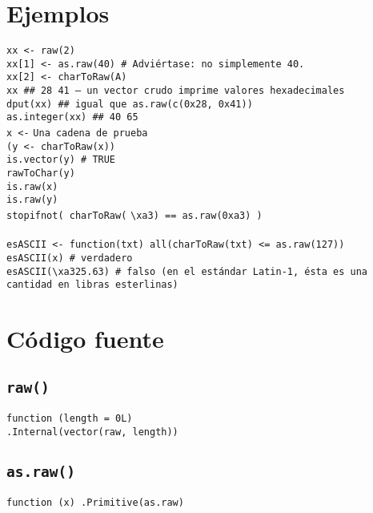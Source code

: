 \documentclass{article}[letter, 12pt]
\newlength\tindent
\renewcommand{\indent}{\hspace*{\tindent}}
\def\code#1{\texttt{#1}}
\begin{document}
\section{\color{gray}Ejemplos}
\indent\code{xx <- raw(2)} \\
\indent\code{xx[1] <- as.raw(40)     \# Adviértase: no simplemente 40.} \\
\indent\code{xx[2] <- charToRaw(}\textquotedbl\code{A}\textquotedbl\code{)} \\
\indent\code{xx       \#\# 28 41   -- un vector crudo imprime valores hexadecimales} \\
\indent\code{dput(xx) \#\# igual que as.raw(c(0x28, 0x41))} \\
\indent\code{as.integer(xx) \#\# 40 65} \\
\indent\code{x <-} \textquotedbl\code{Una cadena de prueba}\textquotedbl\ \\
\indent\code{(y <- charToRaw(x))} \\
\indent\code{is.vector(y) \# TRUE} \\
\indent\code{rawToChar(y)} \\
\indent\code{is.raw(x)} \\
\indent\code{is.raw(y)} \\
\indent\code{stopifnot( charToRaw(} \textquotedbl\code{\textbackslash xa3}\textquotedbl\code{) == as.raw(0xa3) )} \\\\
\indent\code{esASCII <-  function(txt) all(charToRaw(txt) <= as.raw(127))} \\
\indent\code{esASCII(x)  \# verdadero} \\
\indent\code{esASCII(}\textquotedbl\code{\textbackslash xa325.63}\textquotedbl\code{) \# falso (en el estándar Latin-1, ésta es una cantidad en libras esterlinas)} \\

\section{\color{gray}Código fuente}
\subsection{\color{gray} \code{raw()}}
\indent\code{function (length = 0L) } \\
\indent\indent\code{.Internal(vector(\textquotedbl\code{raw}\textquotedbl, length))}\\
\subsection{\color{gray}\code{as.raw()}}
\indent\code{function (x) .Primitive(\textquotedbl\code{as.raw}\textquotedbl)} \\
\end{document}
